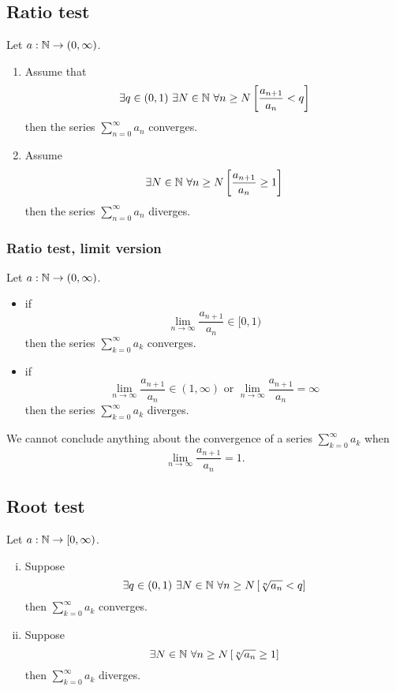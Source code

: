 \subsection{Ratio test}
\uthm Let $a : \mathbb{N} \to (0, \infty)$.
\begin{enumerate}
    \item Assume that \[\exists q \in (0,1)\ \exists N \in \N\ \forall n \geq N
        \left[ \frac{a_{n+1}}{a_n} < q \right]\] then the series
        $\sum_{n=0}^{\infty} a_n$ converges.
    \item Assume \[ \exists N \in \mathbb{N}\ \forall n \geq N \left[ 
        \frac{a_{n+1}}{a_n} \geq 1 \right] \] then the series
        $\sum_{n=0}^{\infty} a_n$ diverges.
\end{enumerate}

\subsubsection*{Ratio test, limit version}
\ucol Let $a : \mathbb{N} \to (0, \infty)$.
\begin{itemize}
    \item if \[
            \lim_{n \to \infty} \frac{a_{n+1}}{a_n} \in [0,1)
        \] then the series $\sum_{k=0}^{\infty} a_k$ converges.
    \item if \[
            \lim_{n \to \infty} \frac{a_{n+1}}{a_n} \in (1,\infty) \text{ or }
            \lim_{n \to \infty} \frac{a_{n+1}}{a_n} = \infty
        \] then the series $\sum_{k=0}^{\infty} a_k$ diverges.
\end{itemize}
\warning We cannot conclude anything about the convergence of a series
$\sum_{k=0}^{\infty} a_k$ when \[
            \lim_{n \to \infty} \frac{a_{n+1}}{a_n} = 1.
\]

\subsection{Root test}
\uthm Let $a : \mathbb{N} \to [0,\infty)$.
\begin{enumerate}[(i)]
    \item Suppose \[
            \exists q \in (0,1)\ \exists N \in \mathbb{N}\ \forall n \geq N \left[ 
            \sqrt[n]{a_n} < q \right]
        \] then $\sum_{k=0}^{\infty} a_k$ converges.
    \item Suppose \[
            \exists N \in \mathbb{N}\ \forall n \geq N \left[ 
            \sqrt[n]{a_n} \geq 1 \right]
        \] then $\sum_{k=0}^{\infty} a_k$ diverges.
\end{enumerate}

